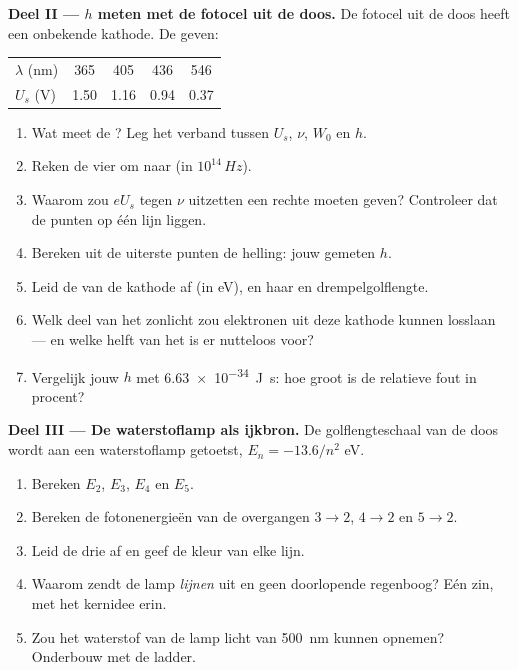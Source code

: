 \begin{problem}
\medskip
\noindent\textbf{Deel II --- $h$ meten met de fotocel uit de doos.}
De fotocel uit de doos heeft een onbekende kathode. De  geven:
\begin{center}\small
\begin{tabular}{lcccc}
$\lambda$ (\unit{nm}) & 365 & 405 & 436 & 546\\
$U_s$ (\unit{V}) & 1.50 & 1.16 & 0.94 & 0.37
\end{tabular}
\end{center}
\begin{enumerate}[resume]
  \item Wat meet de ? Leg het verband tussen $U_s$, $\nu$, $W_0$ en
        $h$.
  \item Reken de vier  om naar  (in
        $10^{14}\,\unit{Hz}$).
  \item Waarom zou $eU_s$ tegen $\nu$ uitzetten een rechte moeten geven?
        Controleer dat de punten op één lijn liggen.
  \item Bereken uit de uiterste punten de helling: jouw gemeten $h$.
  \item Leid de  van de kathode af (in \unit{eV}), en haar
         en drempelgolflengte.
  \item Welk deel van het zonlicht zou elektronen uit deze kathode kunnen
        losslaan --- en welke helft van het  is er nutteloos voor?
  \item Vergelijk jouw $h$ met \qty{6.63e-34}{J.s}: hoe groot is de relatieve
        fout in procent?
\end{enumerate}

\medskip
\noindent\textbf{Deel III --- De waterstoflamp als ijkbron.}
De golflengteschaal van de doos wordt aan een waterstoflamp getoetst,
$E_n = -13.6/n^2$ \unit{eV}.
\begin{enumerate}[resume]
  \item Bereken $E_2$, $E_3$, $E_4$ en $E_5$.
  \item Bereken de fotonenergieën van de overgangen $3 \to 2$, $4 \to 2$ en
        $5 \to 2$.
  \item Leid de drie  af en geef de kleur van elke lijn.
  \item Waarom zendt de lamp \emph{lijnen} uit en geen doorlopende regenboog?
        Eén zin, met het kernidee erin.
  \item Zou het waterstof van de lamp licht van \qty{500}{nm} kunnen opnemen?
        Onderbouw met de ladder.
\end{enumerate}


\end{problem}
